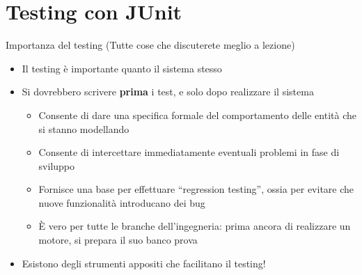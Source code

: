 \documentclass[xcolor=dvipsnames,presentation]{beamer}
\begin{document}
\section{Testing con JUnit}

\begin{frame}{Importanza del testing}
	(Tutte cose che discuterete meglio a lezione)
	\begin{itemize}
		\item Il testing è importante quanto il sistema stesso
		\item Si dovrebbero scrivere \textbf{prima} i test, e solo dopo realizzare il sistema
		\begin{itemize}
			\item Consente di dare una specifica formale del comportamento delle entità che si stanno modellando
			\item Consente di intercettare immediatamente eventuali problemi in fase di sviluppo
			\item Fornisce una base per effettuare ``regression testing'', ossia per evitare che nuove funzionalità introducano dei bug
			\item È vero per tutte le branche dell'ingegneria: prima ancora di realizzare un motore, si prepara il suo banco prova
		\end{itemize}
		\item Esistono degli strumenti appositi che facilitano il testing!
	\end{itemize}
\end{frame}
\end{document}
